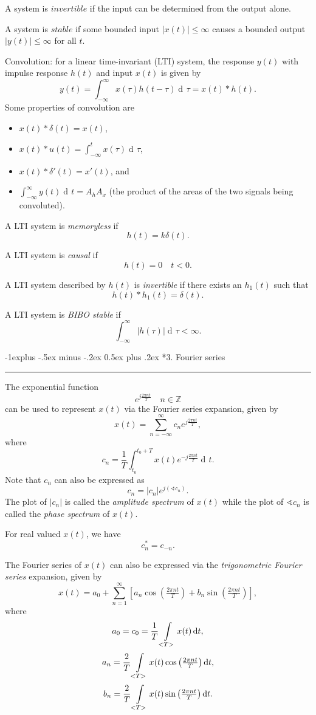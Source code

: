 \documentclass[10pt,letterpaper]{article}
\makeatletter
\DeclareMathOperator{\di}{d\!} %
\newcommand{\sumi}[1][1]{ \sum_{n={#1}}^{\infty} } %
\newcommand{\tpfrac}[2]{\left(\tfrac{#1}{#2}\right)} %
\newcommand{\abs}[1]{\left| #1 \right|} %
\newcommand{\sbracks}[1]{\left[ #1 \right]} %
\newcommand{\Z}{\mathbb{Z}}
\newcommand{\impulse}{ \delta(t) }
\newcommand{\Iint}{ \int_{-\infty}^{\infty} }
\newcommand{\Uint}{ \int\displaylimits_{<T>} }
\newcommand{\epos}{ e^{j\frac{2\pi nt}{T}} }
\newcommand{\eneg}{ e^{-j\frac{2\pi nt}{T}} }
\newcommand{\fatcos}{ \cos\tpfrac{2\pi nt}{T} }
\newcommand{\fatsin}{ \sin\tpfrac{2\pi nt}{T} }
\newcommand{\underlineSection}[1][unnamed]{
\subsection*{#1}
\hrule
\vspace{12pt}
}
\renewcommand{\subsection}{\@startsection{subsection}{2}{0mm}%
                                {-1explus -.5ex minus -.2ex}%
                                {0.5ex plus .2ex}%
                                {\normalfont\normalsize\bfseries}}
\makeatother
\begin{document}
\begin{multicols*}{3}
A system is $invertible$ if the input can be determined from the output alone.

A system is $stable$ if some bounded input $\abs{x(t)} \leq \infty$ causes a bounded output $\abs{y(t)} \leq \infty$ for all $t$.

Convolution: for a linear time-invariant (LTI) system, the response $y(t)$ with impulse response $h(t)$ and input $x(t)$ is given by
\[ y(t) = \Iint x(\tau) h(t-\tau) \di \tau = x(t)*h(t). \]
Some properties of convolution are
\begin{itemize}[leftmargin=0.5cm]
\item $x(t)*\impulse = x(t)$,
\item $\displaystyle x(t)*u(t) = \int_{-\infty}^t x(\tau) \di\tau$,
\item $x(t)*\delta'(t) = x'(t)$, and
\item $\displaystyle \Iint y(t) \di t = A_h A_x$ (the product of the areas of the two signals being convoluted).
\end{itemize}

A LTI system is \textit{memoryless} if
\[ h(t) = k\impulse. \]

A LTI system is \textit{causal} if
\[ h(t) = 0 \quad t < 0. \]

A LTI system described by $h(t)$ is \textit{invertible} if there exists an $h_1(t)$ such that
\[ h(t)*h_1(t) = \impulse. \]

A LTI system is \textit{BIBO stable} if
\[ \Iint \abs{h(\tau)} \di\tau < \infty. \]

\underlineSection[3. Fourier series]
The exponential function
\[ \epos \quad n \in \Z \]
can be used to represent $x(t)$ via the Fourier series expansion, given by
\[ x(t) = \sumi[-\infty] c_n \epos, \]
where
\[ c_n = \dfrac{1}{T} \int_{t_0}^{t_0 + T} x(t) \eneg \di t. \]
Note that $c_n$ can also be expressed as
\[ c_n = |c_n|e^{j(\sphericalangle c_n)}. \]
The plot of $|c_n|$ is called the \textit{amplitude spectrum} of $x(t)$ while the plot of $\sphericalangle c_n$ is called the \textit{phase spectrum} of $x(t)$.

For real valued $x(t)$, we have
\[ c_n^* = c_{-n}. \]

The Fourier series of $x(t)$ can also be expressed via the \textit{trigonometric Fourier series} expansion, given by
\[ x(t) = a_0 + \sumi \sbracks{ a_n \fatcos + b_n \fatsin }, \]
where
\[ a_0 = c_0 = \dfrac{1}{T} \Uint x(t) \di t, \]
\[ a_n = \dfrac{2}{T} \Uint x(t) \fatcos \di t, \]
\[ b_n = \dfrac{2}{T} \Uint x(t) \fatsin \di t. \]


\end{multicols*}
\end{document}
